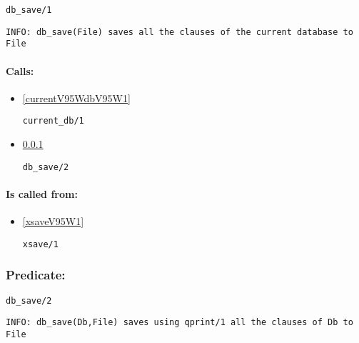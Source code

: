 \begin{verbatim}
db_save/1
\end{verbatim}

{\small \begin{verbatim}
INFO: db_save(File) saves all the clauses of the current database to File

\end{verbatim}}
\paragraph{Calls:} 
\begin{itemize}
\item \ref{currentV95WdbV95W1} 
\begin{verbatim}
current_db/1
\end{verbatim}

\item \ref{dbV95WsaveV95W2} 
\begin{verbatim}
db_save/2
\end{verbatim}

\end{itemize}
\paragraph{Is called from:} 
\begin{itemize}
\item \ref{xsaveV95W1} 
\begin{verbatim}
xsave/1
\end{verbatim}

\end{itemize}

\subsubsection{Predicate:} \label{dbV95WsaveV95W2}

\begin{verbatim}
db_save/2
\end{verbatim}

{\small \begin{verbatim}
INFO: db_save(Db,File) saves using qprint/1 all the clauses of Db to File

\end{verbatim}}
